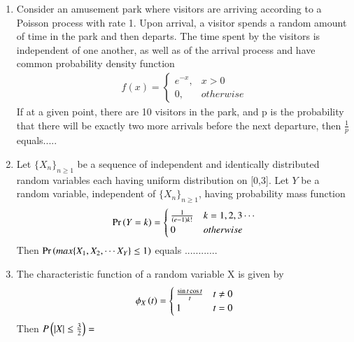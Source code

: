 \documentclass[journal,12pt,twocolumn]{IEEEtran}
\begin{document}
\begin{enumerate}
\item  Consider an amusement park where visitors are arriving according to a Poisson process with rate 1. Upon arrival, a visitor spends a random amount of time in the park and then departs. The time spent by the visitors is independent of one another, as well as of the arrival process and have common probability density function 
\begin{align}
    f(x) = 
    \begin{cases}
        e^{-x}, & x > 0\\
        0,      & otherwise
    \end{cases}
\end{align}
If at a given point, there are 10 visitors in the park, and p is the probability that there will be exactly two more arrivals before the next departure, then $\frac{1}{p}$ equals.....
\solution
  

\item  Let $\{X_n\}_{n\ge 1}$ be a sequence of independent and identically distributed random variables each having uniform distribution on [0,3]. Let $Y$ be a random variable, independent of $\{X_n\}_{n\ge 1}$, having probability mass function
\begin{align}
\Pr\left(Y=k\right) = 
\begin{cases}
\frac{1}{(e-1)k!} & k=1,2,3\cdots \\
0 & otherwise
\end{cases}
\end{align}
Then $\Pr\left(max\{X_1,X_2,\cdots X_Y\}\le 1\right)$ equals ............\\
%
\solution
  

\item The characteristic function of a random variable X is given by
\begin{align}
\phi_{X}\left(t\right)
=
\begin{cases}
\frac{\sin{t}\cos{t}}{t}           & t \neq 0 \\
1        & t = 0
\end{cases}
\end{align}
Then $ P\left(|X|\leq \frac{3}{2}\right) =$ 
%
\solution
  
%   


\end{enumerate}
\end{document}
